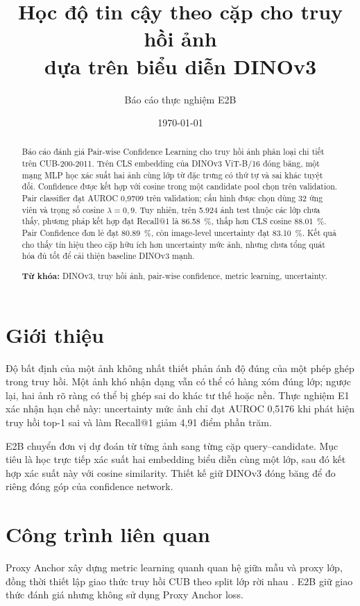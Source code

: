 \documentclass[11pt,a4paper]{article}
\title{\bfseries\LARGE Học độ tin cậy theo cặp cho truy hồi ảnh\\[0.3em]
dựa trên biểu diễn DINOv3}
\author{Báo cáo thực nghiệm E2B}
\date{\today}
\begin{document}
\maketitle
\thispagestyle{plain}

\begin{abstract}
Báo cáo đánh giá Pair-wise Confidence Learning cho truy hồi ảnh phân loại chi tiết trên CUB-200-2011. Trên CLS embedding của DINOv3 ViT-B/16 đóng băng, một mạng MLP học xác suất hai ảnh cùng lớp từ đặc trưng có thứ tự và sai khác tuyệt đối. Confidence được kết hợp với cosine trong một candidate pool chọn trên validation. Pair classifier đạt AUROC 0,9709 trên validation; cấu hình được chọn dùng 32 ứng viên và trọng số cosine $\lambda=0,9$. Tuy nhiên, trên 5.924 ảnh test thuộc các lớp chưa thấy, phương pháp kết hợp đạt Recall@1 là \SI{86.58}{\percent}, thấp hơn CLS cosine \SI{88.01}{\percent}. Pair Confidence đơn lẻ đạt \SI{80.89}{\percent}, còn image-level uncertainty đạt \SI{83.10}{\percent}. Kết quả cho thấy tín hiệu theo cặp hữu ích hơn uncertainty mức ảnh, nhưng chưa tổng quát hóa đủ tốt để cải thiện baseline DINOv3 mạnh.

\noindent\textbf{Từ khóa:} DINOv3, truy hồi ảnh, pair-wise confidence, metric learning, uncertainty.
\end{abstract}

\section{Giới thiệu}
Độ bất định của một ảnh không nhất thiết phản ánh độ đúng của một phép ghép trong truy hồi. Một ảnh khó nhận dạng vẫn có thể có hàng xóm đúng lớp; ngược lại, hai ảnh rõ ràng có thể bị ghép sai do khác tư thế hoặc nền. Thực nghiệm E1 xác nhận hạn chế này: uncertainty mức ảnh chỉ đạt AUROC 0,5176 khi phát hiện truy hồi top-1 sai và làm Recall@1 giảm 4,91 điểm phần trăm.

E2B chuyển đơn vị dự đoán từ từng ảnh sang từng cặp query--candidate. Mục tiêu là học trực tiếp xác suất hai embedding biểu diễn cùng một lớp, sau đó kết hợp xác suất này với cosine similarity. Thiết kế giữ DINOv3 đóng băng để đo riêng đóng góp của confidence network.

\section{Công trình liên quan}
Proxy Anchor xây dựng metric learning quanh quan hệ giữa mẫu và proxy lớp, đồng thời thiết lập giao thức truy hồi CUB theo split lớp rời nhau \cite{kim2020proxy}. E2B giữ giao thức đánh giá nhưng không sử dụng Proxy Anchor loss.
\end{document}
